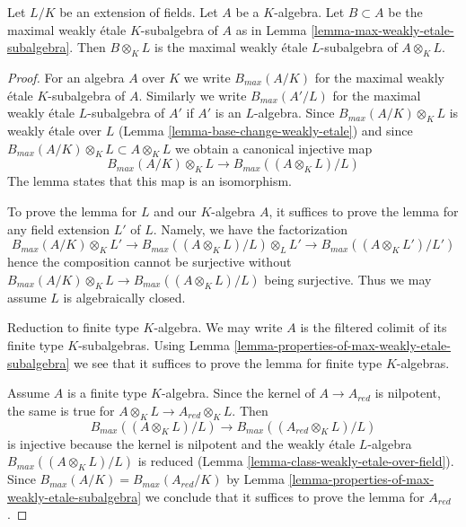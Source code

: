 %
\begin{lemma}
\label{lemma-change-fields-max-weakly-etale-subalgebra}
Let $L/K$ be an extension of fields. Let $A$ be a $K$-algebra.
Let $B \subset A$ be the maximal weakly \'etale $K$-subalgebra of
$A$ as in Lemma \ref{lemma-max-weakly-etale-subalgebra}.
Then $B \otimes_K L$ is the maximal weakly \'etale $L$-subalgebra
of $A \otimes_K L$.
\end{lemma}

\begin{proof}
For an algebra $A$ over $K$ we write $B_{max}(A/K)$
for the maximal weakly \'etale $K$-subalgebra of $A$.
Similarly we write $B_{max}(A'/L)$ for the maximal weakly \'etale
$L$-subalgebra of $A'$ if $A'$ is an $L$-algebra.
Since $B_{max}(A/K) \otimes_K L$ is weakly \'etale over $L$
(Lemma \ref{lemma-base-change-weakly-etale})
and since $B_{max}(A/K) \otimes_K L \subset A \otimes_K L$
we obtain a canonical injective map
$$
B_{max}(A/K) \otimes_K L \to B_{max}((A \otimes_K L)/L)
$$
The lemma states that this map is an isomorphism.

\medskip\noindent
To prove the lemma for $L$ and our $K$-algebra $A$, it suffices to
prove the lemma for any field extension $L'$ of $L$. Namely, we have
the factorization
$$
B_{max}(A/K) \otimes_K L' \to
B_{max}((A \otimes_K L)/L) \otimes_L L' \to
B_{max}((A \otimes_K L')/L')
$$
hence the composition cannot be surjective without
$B_{max}(A/K) \otimes_K L \to B_{max}((A \otimes_K L)/L)$
being surjective. Thus we may assume $L$ is algebraically closed.

\medskip\noindent
Reduction to finite type $K$-algebra. We may write $A$
is the filtered colimit of its finite type $K$-subalgebras.
Using Lemma \ref{lemma-properties-of-max-weakly-etale-subalgebra}
we see that it suffices to prove the lemma for finite type
$K$-algebras.

\medskip\noindent
Assume $A$ is a finite type $K$-algebra. Since the kernel
of $A \to A_{red}$ is nilpotent, the same is true for
$A \otimes_K L \to A_{red} \otimes_K L$. Then
$$
B_{max}((A \otimes_K L)/L) \to B_{max}((A_{red} \otimes_K L)/L)
$$
is injective because the kernel is nilpotent and the
weakly \'etale $L$-algebra $B_{max}((A \otimes_K L)/L)$ is reduced
(Lemma \ref{lemma-class-weakly-etale-over-field}).
Since $B_{max}(A/K) = B_{max}(A_{red}/K)$
by Lemma \ref{lemma-properties-of-max-weakly-etale-subalgebra}
we conclude
that it suffices to prove the lemma for $A_{red}$.


\end{proof}
